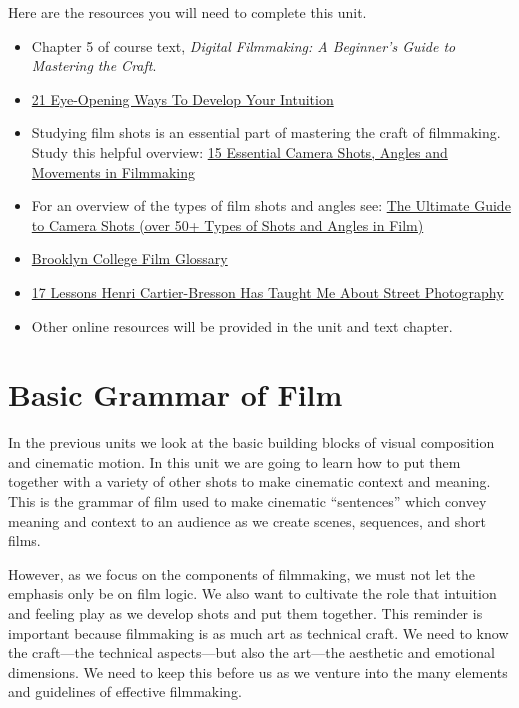 \documentclass[
  letterpaper,
  DIV=11,
  numbers=noendperiod]{scrreprt}
\providecommand{\tightlist}{%
  \setlength{\itemsep}{0pt}\setlength{\parskip}{0pt}}\usepackage{longtable,booktabs,array}
\begin{document}
Here are the resources you will need to complete this unit.

\begin{itemize}
\tightlist
\item
  Chapter 5 of course text, \emph{Digital Filmmaking: A Beginner's Guide
  to Mastering the Craft}.
\item
  \href{https://liveboldandbloom.com/04/self-improvement/develop-your-intuition}{21
  Eye-Opening Ways To Develop Your Intuition}
\item
  Studying film shots is an essential part of mastering the craft of
  filmmaking. Study this helpful overview:
  \href{https://www.youtube.com/watch?v=7y0ouVBcogU}{15 Essential Camera
  Shots, Angles and Movements in Filmmaking}
\item
  For an overview of the types of film shots and angles see:
  \href{https://www.studiobinder.com/blog/ultimate-guide-to-camera-shots/}{The
  Ultimate Guide to Camera Shots (over 50+ Types of Shots and Angles in
  Film)}
\item
  \href{http://userhome.brooklyn.cuny.edu/anthro/jbeatty/COURSES/glossary.htm}{Brooklyn
  College Film Glossary}
\item
  \href{https://erickimphotography.com/blog/2014/12/09/17-lessons-henri-cartier-bresson-taught-street-photography/}{17
  Lessons Henri Cartier-Bresson Has Taught Me About Street Photography}
\item
  Other online resources will be provided in the unit and text chapter.
\end{itemize}

\section{Basic Grammar of Film}\label{basic-grammar-of-film}

In the previous units we look at the basic building blocks of visual
composition and cinematic motion. In this unit we are going to learn how
to put them together with a variety of other shots to make cinematic
context and meaning. This is the grammar of film used to make cinematic
``sentences'' which convey meaning and context to an audience as we
create scenes, sequences, and short films.

However, as we focus on the components of filmmaking, we must not let
the emphasis only be on film logic. We also want to cultivate the role
that intuition and feeling play as we develop shots and put them
together. This reminder is important because filmmaking is as much art
as technical craft. We need to know the craft---the technical
aspects---but also the art---the aesthetic and emotional dimensions. We
need to keep this before us as we venture into the many elements and
guidelines of effective filmmaking.
\end{document}
